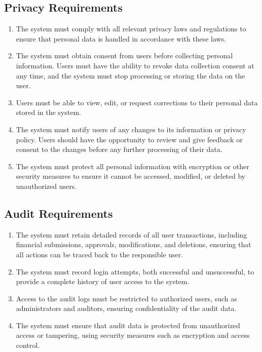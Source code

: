 \documentclass[12pt]{article}
\begin{document}
\subsection{Privacy Requirements}

\begin{enumerate}
  \item The system must comply with all relevant privacy laws and regulations to ensure that personal data is handled in accordance with these laws.
  \item The system must obtain consent from users before collecting personal information. Users must have the ability to revoke data collection consent at any time, and the system must stop processing or storing the data on the user.
  \item Users must be able to view, edit, or request corrections to their personal data stored in the system.
  \item The system must notify users of any changes to its information or privacy policy. Users should have the opportunity to review and give feedback or consent to the changes before any further processing of their data.
  \item The system must protect all personal information with encryption or other security measures to ensure it cannot be accessed, modified, or deleted by unauthorized users. 
\end{enumerate}

\subsection{Audit Requirements}

\begin{enumerate}
  \item The system must retain detailed records of all user transactions, including financial submissions, approvals, modifications, and deletions, ensuring that all actions can be traced back to the responsible user.
  \item The system must record login attempts, both successful and unsuccessful, to provide a complete history of user access to the system.
  \item Access to the audit logs must be restricted to authorized users, such as administrators and auditors, ensuring confidentiality of the audit data.
  \item The system must ensure that audit data is protected from unauthorized access or tampering, using security measures such as encryption and access control.
\end{enumerate}
\end{document}
